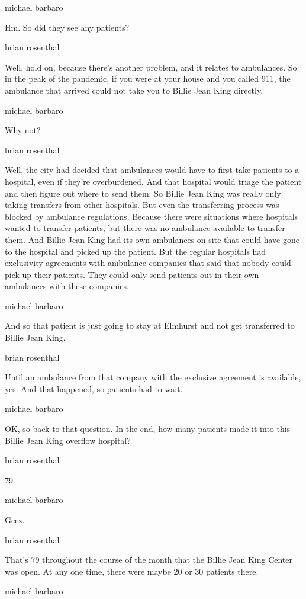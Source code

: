 michael barbaro

Hm. So did they see any patients?

brian rosenthal

Well, hold on, because there's another problem, and it relates to
ambulances. So in the peak of the pandemic, if you were at your house
and you called 911, the ambulance that arrived could not take you to
Billie Jean King directly.

michael barbaro

Why not?

brian rosenthal

Well, the city had decided that ambulances would have to first take
patients to a hospital, even if they're overburdened. And that hospital
would triage the patient and then figure out where to send them. So
Billie Jean King was really only taking transfers from other hospitals.
But even the transferring process was blocked by ambulance regulations.
Because there were situations where hospitals wanted to transfer
patients, but there was no ambulance available to transfer them. And
Billie Jean King had its own ambulances on site that could have gone to
the hospital and picked up the patient. But the regular hospitals had
exclusivity agreements with ambulance companies that said that nobody
could pick up their patients. They could only send patients out in their
own ambulances with these companies.

michael barbaro

And so that patient is just going to stay at Elmhurst and not get
transferred to Billie Jean King.

brian rosenthal

Until an ambulance from that company with the exclusive agreement is
available, yes. And that happened, so patients had to wait.

michael barbaro

OK, so back to that question. In the end, how many patients made it into
this Billie Jean King overflow hospital?

brian rosenthal

79.

michael barbaro

Geez.

brian rosenthal

That's 79 throughout the course of the month that the Billie Jean King
Center was open. At any one time, there were maybe 20 or 30 patients
there.

michael barbaro

